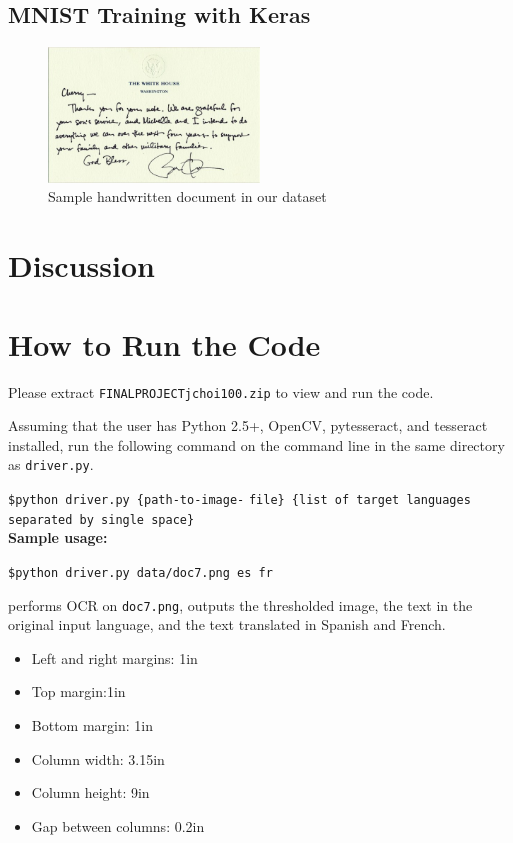 \documentclass[11pt,letterpaper]{article}
\begin{document}
\subsection{MNIST Training with Keras}

\begin{figure}[t!]
  \centering
  \includegraphics[keepaspectratio, width=0.5\textwidth]{obama4.png}
  \caption{Sample handwritten document in our dataset}
\end{figure}



\section{Discussion}

\section{How to Run the Code}

Please extract {\tt FINAL\textunderscore PROJECT\textunderscore jchoi100.zip} to view and run the code.

Assuming that the user has Python 2.5+, OpenCV, pytesseract, and tesseract installed, run the following command on the command line in the same directory as {\tt driver.py}.

{\tt \$python driver.py \{path-to-image-} {\tt file\} \{list of target languages separated by single space\}}\\

\textbf{Sample usage:}

{\tt \$python driver.py data/doc7.png es fr}

performs OCR on {\tt doc7.png}, outputs the thresholded image, the text in the original input language, and the text translated in Spanish and French.


\begin{itemize}
\item Left and right margins: 1in
\item Top margin:1in
\item Bottom margin: 1in
\item Column width: 3.15in
\item Column height: 9in
\item Gap between columns: 0.2in
\end{itemize}
\end{document}
